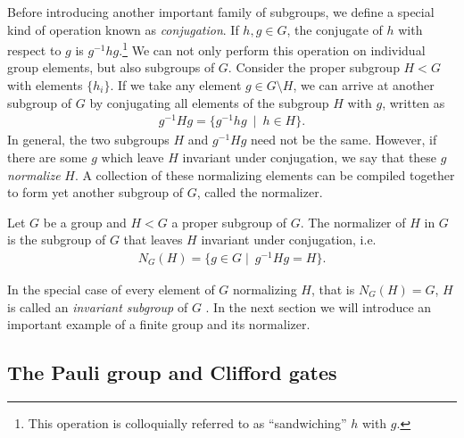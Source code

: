 Before introducing another important family of subgroups, we define a special
kind of operation known as \emph{conjugation}. If $h,g\in G$, the conjugate of
$h$ with respect to $g$ is $g^{-1} h g$.\footnote{This operation is
colloquially referred to as \enquote{sandwiching} $h$ with $g$.}
We can not only perform this operation on individual group elements, but also
subgroups of $G$. 
Consider the proper subgroup $H<G$ with elements $\{h_i\}$. 
If we take any element $g \in G
\setminus H$, we can arrive at another subgroup of $G$ by conjugating all
elements of the
subgroup $H$ with $g$, written as
\begin{align}
  g^{-1}Hg = \{ g^{-1} h g \ \mid \ h \in H \}
.\end{align}
In general, the two subgroups $H$ and $g^{-1}Hg$ need not be the same. However,
if there are some $g$ which leave $H$ invariant under conjugation, we say that
these $g$ \emph{normalize} $H$. A collection of these normalizing elements can
be compiled together to form yet another subgroup of $G$, called the
normalizer.
\begin{defn}\label{defn:normalizer}
  Let $G$ be a group and $H < G$ a proper subgroup of $G$. The normalizer of
  $H$ in $G$ is the subgroup of $G$ that leaves $H$ invariant under
  conjugation, i.e.
  \begin{align}
    N_G(H) = \{ g \in G \mid \ g^{-1} H g = H \}
  .\end{align}
\end{defn}
In the special case of every element of $G$ normalizing $H$, that is $N_G(H) =
G$, $H$ is called an \emph{invariant subgroup} of $G$
\cite{zeeGroupTheoryNutshell2016}. In the next section we
will introduce an important example of a finite group and its normalizer. 
\subsection{The Pauli group and Clifford gates}\label{sec:pauligroup}


